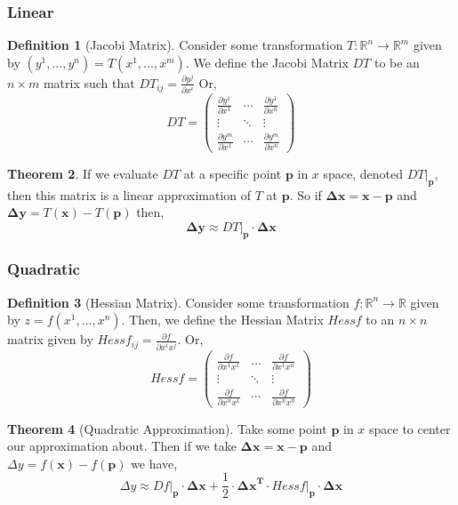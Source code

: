 \documentclass[11pt]{article}
\theoremstyle{definition}
\newtheorem{theorem}{Theorem}[section]
\newtheorem{definition}[theorem]{Definition}
\newcommand{\pder}[2]{\frac{\partial{#1}}{\partial{#2}}}
\begin{document}
\subsubsection{Linear}
\begin{definition}[Jacobi Matrix]
    Consider some transformation $T: \mathbb{R}^n \to \mathbb{R}^m$ given by
    $(y^1,\dots,y^n) = T(x^1, \dots, x^m)$.
    We define the Jacobi Matrix $DT$ to be an $n \times m$ matrix such that
    $DT_{ij} = \pder{y^j}{x^i}$ Or,
    $$DT =
    \begin{pmatrix}
    \pder{y^1}{x^1} & \cdots & \pder{y^1}{x^n}\\
    \vdots          & \ddots & \vdots \\
    \pder{y^m}{x^1} & \cdots & \pder{y^m}{x^n}
    \end{pmatrix}
    $$
\end{definition}
\begin{theorem}
    If we evaluate $DT$ at a specific point $\mathbf{p}$ in $x$ space,
    denoted $DT \vert_{\mathbf{p}}$, then this matrix is a linear
    approximation of $T$ at $\mathbf{p}$. So if 
    $\mathbf{\Delta x} = \mathbf{x} - \mathbf{p}$ 
    and $\mathbf{\Delta y} = T(\mathbf{x}) - T(\mathbf{p})$ then,
    $$
    \mathbf{\Delta y} \approx DT\vert_{\mathbf{p}} \cdot \mathbf{\Delta x}
    $$
\end{theorem}
\subsubsection{Quadratic}
\begin{definition}[Hessian Matrix]
    Consider some transformation $f: \mathbb{R}^n \to \mathbb{R}$ given by 
    $z = f(x^1,\dots,x^n)$. Then, we define the Hessian Matrix $Hessf$ to
    an $n \times n$ matrix given by $Hessf_{ij} = \pder{f}{x^ix^j}$.
    Or,
    $$
    Hessf =
    \begin{pmatrix}
        \pder{f}{x^1x^1} & \dots  & \pder{f}{x^1x^n} \\
        \vdots           & \ddots & \vdots           \\
        \pder{f}{x^nx^1} & \cdots & \pder{f}{x^nx^n}  
    \end{pmatrix}
    $$
\end{definition}
\begin{theorem}[Quadratic Approximation]
    Take some point $\mathbf{p}$ in $x$ space to center our approximation
    about. Then if we take $\mathbf{\Delta x} = \mathbf{x} - \mathbf{p}$
    and $\Delta y = f(\mathbf{x}) - f(\mathbf{p})$ we have,
    $$
    \Delta y \approx Df\vert_{\mathbf{p}} \cdot \mathbf{\Delta x}
    + \frac{1}{2} \cdot \mathbf{{\Delta x}^T} \cdot Hessf\vert_{\mathbf{p}}
    \cdot \mathbf{\Delta x}
    $$
\end{theorem}
\end{document}

